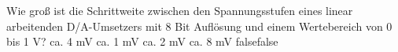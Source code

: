     {Wie groß ist die Schrittweite zwischen den Spannungsstufen eines linear arbeitenden D/A-Umsetzers mit 8 Bit Auflösung und einem Wertebereich von 0 bis 1 V?}
    {ca. 4 mV}
    {ca. 1 mV}
    {ca. 2 mV}
    {ca. 8 mV}
    {false}{false}